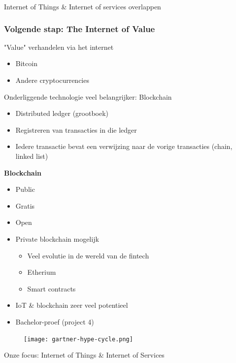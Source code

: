 \documentclass{article}
\newcommand{\bold}[1]{\textbf{#1}}
\begin{document}
Internet of Things \& Internet of services overlappen

\subsubsection{Volgende stap: The Internet of Value}

"Value" verhandelen via het internet

\begin{itemize}
    \item Bitcoin
    \item Andere cryptocurrencies
\end{itemize}

Onderliggende technologie veel belangrijker: Blockchain

\begin{itemize}
    \item Distributed ledger (grootboek)
    \item Registreren van transacties in die ledger
    \item Iedere transactie bevat een verwijzing naar de vorige transacties (chain, linked list)
\end{itemize}

\bold{Blockchain}
\begin{itemize}
    \item Public
    \item Gratis
    \item Open
\end{itemize}

\begin{itemize}
    \item Private blockchain mogelijk
    \begin{itemize}
        \item Veel evolutie in de wereld van de fintech
        \item Etherium
        \item Smart contracts
    \end{itemize}
    \item IoT \& blockchain zeer veel potentieel
    \item Bachelor-proef (project 4)
\end{itemize}

\begin{figure}[H]
    \centering
    \texttt{[image: gartner-hype-cycle.png]}
    \caption{}
\end{figure}

Onze focus: Internet of Things \& Internet of Services
\end{document}

